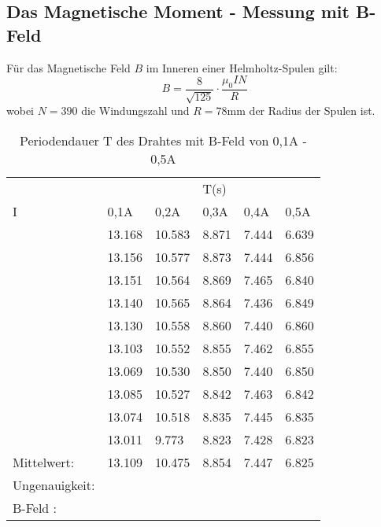 \subsection{Das Magnetische Moment - Messung mit B-Feld}

Für das Magnetische Feld $B$ im Inneren einer Helmholtz-Spulen gilt:
\begin{equation}
    B= \frac{8}{\sqrt{125}} \cdot \frac{\mu_0 I N}{R}
\end{equation}
wobei $N=390$ die Windungszahl und $R=78$mm der Radius der Spulen ist.



\newpage
\begin{table}
    \centering
    \label{tab:tabelle_1}
    \begin{tabular}{p{3cm} | p{1.5cm} p{1.5cm} p{1.5cm} p{1.5cm} p{1.5cm}}
      &      &      & T(s) &      &     \\
    I & 0,1A & 0,2A & 0,3A & 0,4A & 0,5A\\
    \midrule
    & 13.168 & 10.583 & 8.871 &  7.444 &  6.639\\   
    & 13.156 & 10.577 & 8.873 &  7.444 &  6.856\\   
    & 13.151 & 10.564 & 8.869 &  7.465 &  6.840\\   
    & 13.140 & 10.565 & 8.864 &  7.436 &  6.849\\   
    & 13.130 & 10.558 & 8.860 &  7.440 &  6.860\\   
    & 13.103 & 10.552 & 8.855 &  7.462 &  6.855\\   
    & 13.069 & 10.530 & 8.850 &  7.440 &  6.850\\   
    & 13.085 & 10.527 & 8.842 & 7.463  &  6.842\\   
    & 13.074 & 10.518 & 8.835 &  7.445 &  6.835\\   
    & 13.011 & 9.773  & 8.823 &  7.428 &  6.823\\ 
    \midrule
    Mittelwert:    & 13.109 & 10.475 & 8.854 & 7.447 & 6.825 \\
    Ungenauigkeit: & & & & & \\
    \midrule
    B-Feld : & & & & & \\
    \bottomrule
    \end{tabular}
    \caption{Periodendauer T des Drahtes mit B-Feld von 0,1A - 0,5A}
    \label{tab:tabelle_01A}
\end{table}

